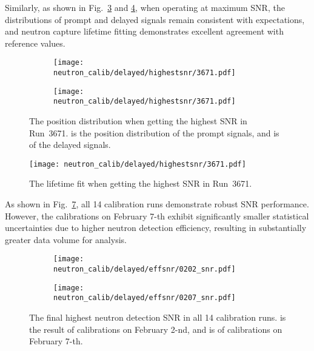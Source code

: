 Similarly, as shown in Fig.~\ref{fig:highestSNRPos} and \ref{fig:3671_HighestSNRDtFit}, when operating at maximum SNR, the distributions of prompt and delayed signals remain consistent with expectations, and neutron capture lifetime fitting demonstrates excellent agreement with reference values.
\begin{figure}[h]
	\begin{subfigure}{0.5\textwidth}
		\centering
		\texttt{[image: neutron\_calib/delayed/highestsnr/3671.pdf]}
		\caption{}
		\label{fig:3671HighestSNRProPos}
	\end{subfigure}%
	\begin{subfigure}{0.5\textwidth}
		\centering
		\texttt{[image: neutron\_calib/delayed/highestsnr/3671.pdf]}
		\caption{}
		\label{fig:3671HighestSNRDelPos}
	\end{subfigure}
	\caption{The position distribution when getting the highest SNR in Run~3671.  is the position distribution of the prompt signals, and  is of the delayed signals.}
	\label{fig:highestSNRPos}
\end{figure}
\begin{figure}[h]
	\centering
	\texttt{[image: neutron\_calib/delayed/highestsnr/3671.pdf]}
	\caption{The lifetime fit when getting the highest SNR in Run~3671.}
	\label{fig:3671_HighestSNRDtFit}
\end{figure}

As shown in Fig.~\ref{fig:SummarySNR}, all 14 calibration runs demonstrate robust SNR performance. However, the calibrations on February 7-th exhibit significantly smaller statistical uncertainties due to higher neutron detection efficiency, resulting in substantially greater data volume for analysis.
\begin{figure}[h]
	\begin{subfigure}{0.5\textwidth}
		\centering
		\texttt{[image: neutron\_calib/delayed/effsnr/0202\_snr.pdf]}
		\caption{}
		\label{fig:SummarySNR0202}
	\end{subfigure}%
	\begin{subfigure}{0.5\textwidth}
		\centering
		\texttt{[image: neutron\_calib/delayed/effsnr/0207\_snr.pdf]}
		\caption{}
		\label{fig:SummarySNR0207}
	\end{subfigure}
	\caption{The final highest neutron detection SNR in all 14 calibration runs.  is the result of calibrations on February 2-nd, and  is of calibrations on February 7-th. }
	\label{fig:SummarySNR}
\end{figure}


